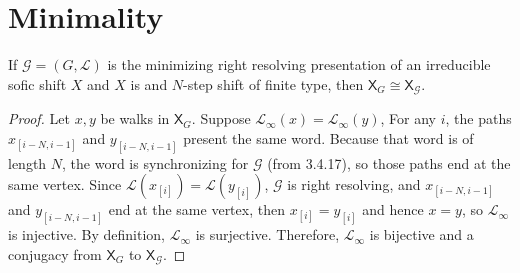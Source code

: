 \documentclass[hidelinks]{article}
\newcommand{\Gc}{\mathcal{G}}  %
\newcommand{\Hc}{\mathcal{H}}  %
\newcommand{\GtH}{{\Gc^\to\Hc}}
\newcommand{\shift}[1]{\mathsf{X}_{#1}}
\theoremstyle{definition}
\begin{document}


\newpage

\section{Minimality}



    \begin{theorem}
        If \(\mathcal{G} = (G, \mathcal{L})\) is the minimizing right resolving
        presentation of an irreducible sofic shift \(X\) and \(X\) is and
        \(N\)-step shift of finite type, then \(\shift{G} \cong \shift{\Gc}\).
    \end{theorem}
    
    \begin{proof}
        Let \(x, y\) be walks in \(\shift{G}\). Suppose \(\mathcal{L}_\infty(x)=\mathcal{L}_\infty(y)\),
        For any \(i\), the paths \(x_{[i-N, i-1]}\) and \(y_{[i-N, i-1]}\) present 
        the same word. Because that word is of length \(N\), the word is synchronizing
        for \(\mathcal{G}\) (from 3.4.17), so those paths end at the same vertex. Since
        \(\mathcal{L}(x_{[i]}) = \mathcal{L}(y_{[i]})\), \(\mathcal{G}\) is right 
        resolving, and \(x_{[i-N, i-1]}\) and \(y_{[i-N, i-1]}\) end at the same vertex,
        then \(x_{[i]} = y_{[i]}\) and hence \(x = y\), so \(\mathcal{L}_\infty\) is injective.
        By definition, \(\mathcal{L}_\infty\) is surjective. Therefore, \(\mathcal{L}_\infty\) is bijective and 
        a conjugacy from \(\mathsf{X}_G\) to \(\mathsf{X}_\mathcal{G}\).
    \end{proof}
\end{document}
